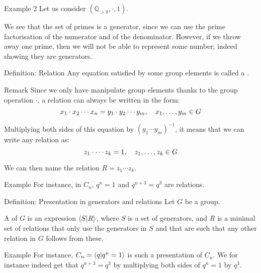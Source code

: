 \documentclass[a4paper]{article}
\begin{document}
\begin{parag}{Example 2}
    Let us consider $\left(\mathbb{Q}_{> 0}, \cdot, 1\right)$.

    We see that the set of primes is a generator, since we can use the prime factorisation of the numerator and of the denominator. However, if we throw away one prime, then we will not be able to represent some number; indeed showing they are generators.
\end{parag}

\begin{parag}{Definition: Relation}
    Any equation satisfied by some group elements is called a .

    \begin{subparag}{Remark}
        Since we only have manipulate group elements thanks to the group operation $\cdot $, a relation can always be written in the form: 
        \[x_1 \cdot x_2 \cdots x_n = y_1 \cdot y_2 \cdots y_m, \quad  x_1, \ldots, y_m \in G\]
    
        Multiplying both sides of this equation by $\left(y_1 \cdots y_m\right)^{-1}$, it means that we can write any relation as: 
        \[z_1 \cdot \cdots z_k = 1, \quad z_1, \ldots, z_k \in G \]

        We can then name the relation $R = z_1 \cdots z_k$. 
    \end{subparag}
    
    \begin{subparag}{Example}
        For instance, in $C_n$, $q^n = 1$ and $q^{n+3} = q^3$ are relations.
    \end{subparag}
\end{parag}

\begin{parag}{Definition: Presentation in generators and relations}
    Let $G$ be a group.

    A  of $G$ is an expression $\braket{S}{R}$, where $S$ is a set of generators, and $R$ is a minimal set of relations that only use the generators in $S$ and that are such that any other relation in $G$ follows from these.

    \begin{subparag}{Example}
        For instance, $C_n = \braket{q}{q^n = 1}$ is such a presentation of $C_n$. We for instance indeed get that $q^{n+3} = q^3$ by multiplying both sides of $q^n  =1$ by $q^3$.
    \end{subparag}
\end{parag}
\end{document}
